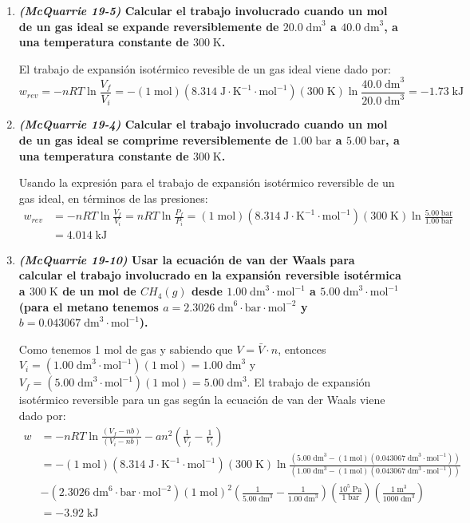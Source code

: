 \documentclass[a4paper,12pt]{article}
\begin{document}
\begin{enumerate}
\begin{enumerate}
 \end{enumerate}

 \item \textbf{\textit{(McQuarrie 19-5)} Calcular el trabajo involucrado cuando un mol de un gas ideal se expande reversiblemente de $20.0\;\mbox{dm}^3$ a $40.0\;\mbox{dm}^3$, a una temperatura constante de $300\;\mbox{K}$.} %

El trabajo de expansi\'on isot\'ermico revesible de un gas ideal viene dado por:
$$w_{rev}=-nRT\ln\frac{V_f}{V_i}=-(1\;\mbox{mol})(8.314\;\mbox{J}\cdot\mbox{K}^{-1}\cdot\mbox{mol}^{-1})(300\;\mbox{K})\ln\frac{40.0\;\mbox{dm}^3}{20.0\;\mbox{dm}^3}=-1.73\;\mbox{kJ}$$

 \item \textbf{\textit{(McQuarrie 19-4)} Calcular el trabajo involucrado cuando un mol de un gas ideal se comprime reversiblemente de $1.00\;\mbox{bar}$ a $5.00\;\mbox{bar}$, a una temperatura constante de $300\;\mbox{K}$.} %

Usando la expresi\'on para el trabajo de expansi\'on isot\'ermico reversible de un gas ideal, en t\'erminos de las presiones:
\begin{align*}
w_{rev}&=-nRT\ln\frac{V_f}{V_i}=nRT\ln\frac{P_f}{P_i}=(1\;\mbox{mol})(8.314\;\mbox{J}\cdot\mbox{K}^{-1}\cdot\mbox{mol}^{-1})(300\;\mbox{K})\ln\frac{5.00\;\mbox{bar}}{1.00\;\mbox{bar}}\\
&=4.014\;\mbox{kJ}
\end{align*}

 \item \textbf{\textit{(McQuarrie 19-10)} Usar la ecuaci\'on de van der Waals para calcular el trabajo involucrado en la expansi\'on reversible isot\'ermica a $300\;\mbox{K}$ de un mol de $CH_4(g)$ desde $1.00\;\mbox{dm}^3\cdot\mbox{mol}^{-1}$ a $5.00\;\mbox{dm}^3\cdot\mbox{mol}^{-1}$ (para el metano tenemos $a=2.3026\;\mbox{dm}^6\cdot\mbox{bar}\cdot\mbox{mol}^{-2}$ y $b=0.043067\;\mbox{dm}^3\cdot\mbox{mol}^{-1}$).} %

Como tenemos 1 mol de gas y sabiendo que $V=\bar{V}\cdot n$, entonces $V_i=(1.00\;\mbox{dm}^3\cdot\mbox{mol}^{-1})(1\;\mbox{mol})=1.00\;\mbox{dm}^3$ y $V_f=(5.00\;\mbox{dm}^3\cdot\mbox{mol}^{-1})(1\;\mbox{mol})=5.00\;\mbox{dm}^3$. El trabajo de expansi\'on isot\'ermico reversible para un gas seg\'un la ecuaci\'on de van der Waals viene dado por: 
\begin{align*}
w&=-nRT\ln\frac{(V_f-nb)}{(V_i-nb)}-an^2\left(\frac{1}{V_f}-\frac{1}{V_i}\right) \\
&=-(1\;\mbox{mol})(8.314\;\mbox{J}\cdot\mbox{K}^{-1}\cdot\mbox{mol}^{-1})(300\;\mbox{K})\ln\frac{(5.00\;\mbox{dm}^3-(1\;\mbox{mol})(0.043067\;\mbox{dm}^3\cdot\mbox{mol}^{-1}))}{(1.00\;\mbox{dm}^3-(1\;\mbox{mol})(0.043067\;\mbox{dm}^3\cdot\mbox{mol}^{-1}))} \\
& -(2.3026\;\mbox{dm}^6\cdot\mbox{bar}\cdot\mbox{mol}^{-2})(1\;\mbox{mol})^2\left(\frac{1}{5.00\;\mbox{dm}^3}-\frac{1}{1.00\;\mbox{dm}^3}\right)\left(\frac{10^5\;\mbox{Pa}}{1\;\mbox{bar}}\right)\left(\frac{1\;\mbox{m}^3}{1000\;\mbox{dm}^3}\right) \\
&=-3.92\;\mbox{kJ}
\end{align*}


\end{enumerate}
\end{document}
